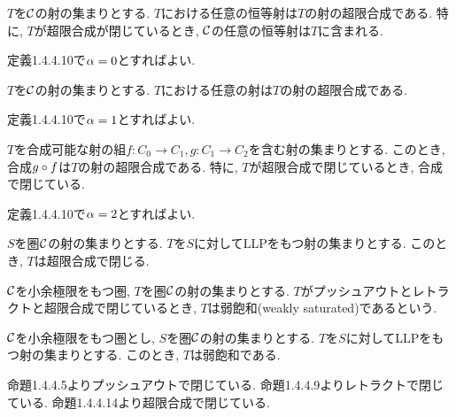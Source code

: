 \documentclass[uplatex, a4paper, 14Q, dvipdfmx]{jsreport}
\begin{document}
\begin{example}
  $T$を$\mathcal{C}$の射の集まりとする. 
  $T$における任意の恒等射は$T$の射の超限合成である. 
  特に, $T$が超限合成が閉じているとき, $\mathcal{C}$の任意の恒等射は$T$に含まれる. 
\end{example}

\begin{Proof}
  定義1.4.4.10で$\alpha=0$とすればよい.
\end{Proof}

\begin{example}
  $T$を$\mathcal{C}$の射の集まりとする. 
  $T$における任意の射は$T$の射の超限合成である. 
\end{example}

\begin{Proof}
  定義1.4.4.10で$\alpha=1$とすればよい.
\end{Proof}

\begin{example}
  $T$を合成可能な射の組$f: C_0 \to C_1, g: C_1 \to C_2$を含む射の集まりとする. 
  このとき, 合成$g \circ f$は$T$の射の超限合成である. 
  特に, $T$が超限合成で閉じているとき, 合成で閉じている. 
\end{example}

\begin{Proof}
  定義1.4.4.10で$\alpha=2$とすればよい.
\end{Proof}

\begin{prop}
  $S$を圏$\mathcal{C}$の射の集まりとする. 
  $T$を$S$に対してLLPをもつ射の集まりとする. 
  このとき, $T$は超限合成で閉じる. 
\end{prop}

\begin{Proof}
  
\end{Proof}

\begin{definition}
  $\mathcal{C}$を小余極限をもつ圏, $T$を圏$\mathcal{C}$の射の集まりとする. 
  $T$がプッシュアウトとレトラクトと超限合成で閉じているとき, $T$は弱飽和(weakly saturated)であるという. 
\end{definition}

\begin{prop}
  $\mathcal{C}$を小余極限をもつ圏とし, $S$を圏$\mathcal{C}$の射の集まりとする. 
  $T$を$S$に対してLLPをもつ射の集まりとする. 
  このとき, $T$は弱飽和である. 
\end{prop}

\begin{Proof}
  命題1.4.4.5よりプッシュアウトで閉じている. 
  命題1.4.4.9よりレトラクトで閉じている. 
  命題1.4.4.14より超限合成で閉じている. 
\end{Proof}
\end{document}
